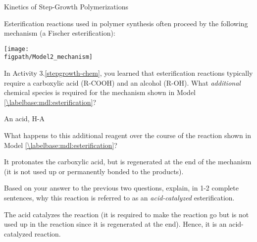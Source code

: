\begin{activity}{Kinetics of Step-Growth Polymerizations}
\begin{ctqs}
		\begin{solution}[2in]
		\end{solution}		

\end{ctqs}
	

\begin{model}
\label{\labelbase:mdl:esterification}

	Esterification reactions used in polymer synthesis often proceed by the following mechanism (a Fischer esterification):
	
	\centerline{\texttt{[image: \\figpath/Model2\_mechanism]}}

\end{model}

\begin{ctqs}

		\question In Activity 3.\ref{stepgrowth-chem}, you learned that esterification reactions typically require a carboxylic acid (R-COOH) and an alcohol (R-OH).  What \emph{additional} chemical species is required for the mechanism shown in Model \ref{\labelbase:mdl:esterification}?
		
			\begin{solution}[0.5in]
				An acid, H-A
			\end{solution}
		
		\question What happens to this additional reagent over the course of the reaction shown in Model \ref{\labelbase:mdl:esterification}?
		
			\begin{solution}[1.25in]
				It protonates the carboxylic acid, but is regenerated at the end of the mechanism (it is not used up or permanently bonded to the products).
			\end{solution}
		
		\question Based on your answer to the previous two questions, explain, in 1-2 complete sentences, why this reaction is referred to as an \emph{acid-catalyzed} esterification.
		
			\begin{solution}[1.75in]
				The acid catalyzes the reaction (it is required to make the reaction go but is not used up in the reaction since it is regenerated at the end).  Hence, it is an acid-catalyzed reaction.
			\end{solution}
			

\end{ctqs}
\end{activity}
